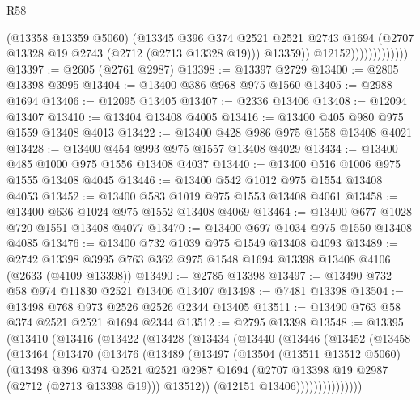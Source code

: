 \begin{lexlean}{R58}
\begin{coremodule}
                                (@13358 @13359 @5060)
                                (@13345
                                  @396
                                  @374
                                  @2521
                                  @2521
                                  @2743
                                  @1694
                                  (@2707 @13328 @19 @2743 (@2712 (@2713 @13328 @19)))
                                  @13359))
                              @12152)))))))))))))
@13397 := @2605 (@2761 @2987)
@13398 := @13397 @2729
@13400 := @2805 @13398 @3995
@13404 := @13400 @386 @968 @975 @1560
@13405 := @2988 @1694
@13406 := @12095 @13405
@13407 := @2336 @13406
@13408 := @12094 @13407
@13410 := @13404 @13408 @4005
@13416 := @13400 @405 @980 @975 @1559 @13408 @4013
@13422 := @13400 @428 @986 @975 @1558 @13408 @4021
@13428 := @13400 @454 @993 @975 @1557 @13408 @4029
@13434 := @13400 @485 @1000 @975 @1556 @13408 @4037
@13440 := @13400 @516 @1006 @975 @1555 @13408 @4045
@13446 := @13400 @542 @1012 @975 @1554 @13408 @4053
@13452 := @13400 @583 @1019 @975 @1553 @13408 @4061
@13458 := @13400 @636 @1024 @975 @1552 @13408 @4069
@13464 := @13400 @677 @1028 @720 @1551 @13408 @4077
@13470 := @13400 @697 @1034 @975 @1550 @13408 @4085
@13476 := @13400 @732 @1039 @975 @1549 @13408 @4093
@13489 := @2742 @13398 @3995 @763 @362 @975 @1548 @1694 @13398 @13408 @4106 (@2633 (@4109 @13398))
@13490 := @2785 @13398
@13497 := @13490 @732 @58 @974 @11830 @2521 @13406 @13407
@13498 := @7481 @13398
@13504 := @13498 @768 @973 @2526 @2526 @2344 @13405
@13511 := @13490 @763 @58 @374 @2521 @2521 @1694 @2344
@13512 := @2795 @13398
@13548 := @13395
    (@13410
      (@13416
        (@13422
          (@13428
            (@13434
              (@13440
                (@13446
                  (@13452
                    (@13458
                      (@13464
                        (@13470
                          (@13476
                            (@13489
                              (@13497
                                (@13504
                                  (@13511 @13512 @5060)
                                  (@13498
                                    @396
                                    @374
                                    @2521
                                    @2521
                                    @2987
                                    @1694
                                    (@2707 @13398 @19 @2987 (@2712 (@2713 @13398 @19)))
                                    @13512))
                                (@12151 @13406)))))))))))))))

\end{coremodule}
\end{lexlean}
